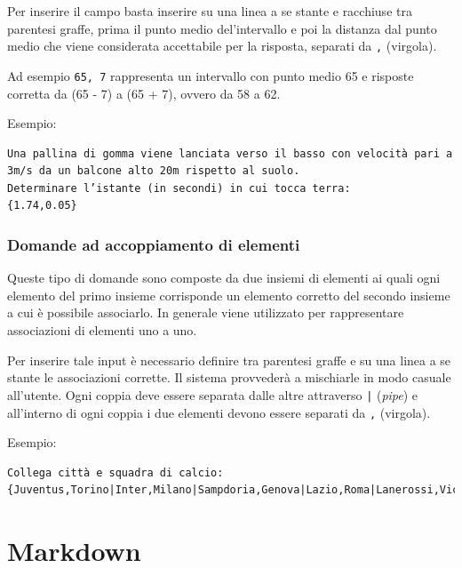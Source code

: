 \documentclass[12pt,a4paper]{article}
\begin{document}
\par Per inserire il campo basta inserire su una linea a se stante e racchiuse tra parentesi graffe, prima il punto medio del'intervallo e poi la distanza dal punto medio che viene considerata accettabile per la risposta, separati da \texttt{,} (virgola). \\

\par Ad esempio \texttt{{65, 7}} rappresenta un intervallo con punto medio 65 e risposte corretta da (65 - 7) a (65 + 7), ovvero da 58 a 62. \\

\par Esempio: \\
\begin{verbatim}
Una pallina di gomma viene lanciata verso il basso con velocità pari a 
3m/s da un balcone alto 20m rispetto al suolo. 
Determinare l’istante (in secondi) in cui tocca terra:
{1.74,0.05}
\end{verbatim}

\subsubsection{Domande ad accoppiamento di elementi}

\par Queste tipo di domande sono composte da due insiemi di elementi ai quali ogni elemento del primo insieme corrisponde un elemento corretto del secondo insieme a cui è possibile associarlo. In generale viene utilizzato per rappresentare associazioni di elementi uno a uno. \\

\par Per inserire tale input è necessario definire tra parentesi graffe e su una linea a se stante le associazioni corrette. Il sistema provvederà a mischiarle in modo casuale all'utente. Ogni coppia deve essere separata dalle altre attraverso \texttt{|} (\textit{pipe}) e all'interno di ogni coppia i due elementi devono essere separati da \texttt{,} (virgola). \\

\par Esempio: \\
\begin{verbatim}
Collega città e squadra di calcio:
{Juventus,Torino|Inter,Milano|Sampdoria,Genova|Lazio,Roma|Lanerossi,Vicenza}
\end{verbatim}

\section{Markdown}
\end{document}
